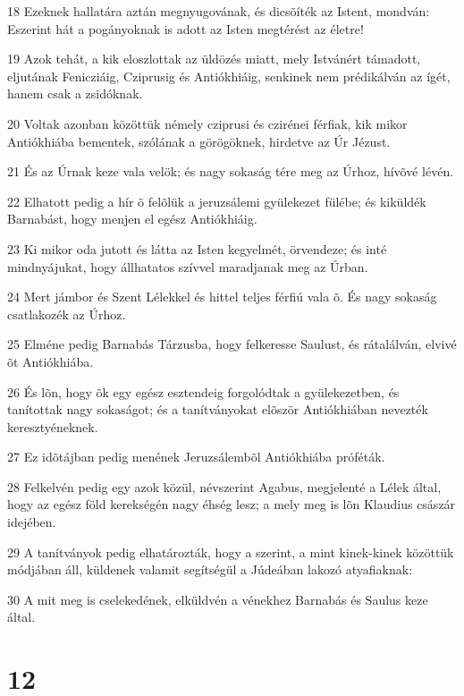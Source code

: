 \par 18 Ezeknek hallatára aztán megnyugovának, és dicsõíték az Istent, mondván: Eszerint hát a pogányoknak is adott az Isten megtérést az életre!
\par 19 Azok tehát, a kik eloszlottak az üldözés miatt, mely Istvánért támadott, eljutának Fenicziáig, Cziprusig és Antiókhiáig, senkinek nem prédikálván az ígét, hanem csak a zsidóknak.
\par 20 Voltak azonban közöttük némely cziprusi és czirénei férfiak, kik mikor Antiókhiába bementek, szólának a görögöknek, hirdetve az Úr Jézust.
\par 21 És az Úrnak keze vala velök; és nagy sokaság tére meg az Úrhoz, hívõvé lévén.
\par 22 Elhatott pedig a hír õ felõlük a jeruzsálemi gyülekezet fülébe; és kiküldék Barnabást, hogy menjen el egész Antiókhiáig.
\par 23 Ki mikor oda jutott és látta az Isten kegyelmét, örvendeze; és inté mindnyájukat, hogy állhatatos szívvel maradjanak meg az Úrban.
\par 24 Mert jámbor és Szent Lélekkel és hittel teljes férfiú vala õ. És nagy sokaság csatlakozék az Úrhoz.
\par 25 Elméne pedig Barnabás Tárzusba, hogy felkeresse Saulust, és rátalálván, elvivé õt Antiókhiába.
\par 26 És lõn, hogy õk egy egész esztendeig forgolódtak a gyülekezetben, és tanítottak nagy sokaságot; és a tanítványokat elõször Antiókhiában nevezték keresztyéneknek.
\par 27 Ez idõtájban pedig menének Jeruzsálembõl Antiókhiába próféták.
\par 28 Felkelvén pedig egy azok közül, névszerint Agabus, megjelenté a Lélek által, hogy az egész föld kerekségén nagy éhség lesz; a mely meg is lõn Klaudius császár idejében.
\par 29 A tanítványok pedig elhatározták, hogy a szerint, a mint kinek-kinek közöttük módjában áll, küldenek valamit segítségül a Júdeában lakozó atyafiaknak:
\par 30 A mit meg is cselekedének, elküldvén a vénekhez Barnabás és Saulus keze  által.

\chapter{12}

